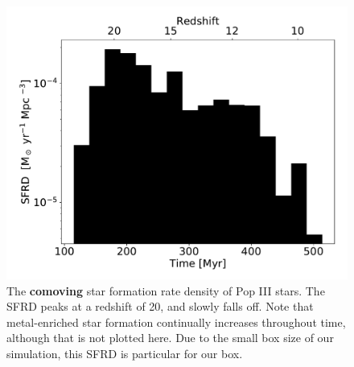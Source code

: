 \documentclass[fleqn,usenatbib]{mnras}
\begin{document}
\begin{figure}
	\includegraphics[width=\columnwidth]{images/pop3_SFR_bar.pdf}
    \caption{The \textbf{comoving} star formation rate density of Pop III stars. The SFRD peaks at a redshift of 20, and slowly falls off. Note that metal-enriched star formation continually increases throughout time, although that is not plotted here. Due to the small box size of our simulation, this SFRD is particular for our box.}
    \label{fig:pop3_SFR_bar}
\end{figure}

\end{document}
